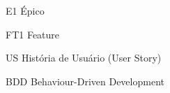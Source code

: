 \begin{siglas}
	\item[E1] Épico 
	\item[FT1] Feature
	\item[US] História de Usuário (User Story)
	\item[BDD] Behaviour-Driven Development
\end{siglas}

